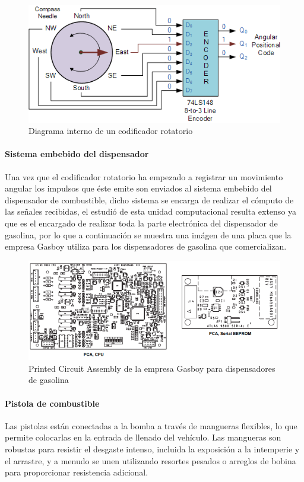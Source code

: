 \begin{figure}[H]
	\centering
	\includegraphics[scale=.8]{Capitulo2/images/electronic_encoder}
	\caption{Diagrama interno de un codificador rotatorio}
	\label{fig:electronic_encoder}
\end{figure}

\paragraph{Sistema embebido del dispensador}
Una vez que el codificador rotatorio ha empezado a registrar un movimiento angular los impulsos que éste emite son enviados al sistema embebido del dispensador de combustible, dicho sistema se encarga de realizar el cómputo de las señales recibidas, el estudió de esta unidad computacional resulta extenso ya que es el encargado de realizar toda la parte electrónica del dispensador de gasolina, por lo que a continuación se muestra una imágen de una placa que la empresa Gasboy utiliza para los dispensadores de gasolina que comercializan.

\begin{figure}[H]
	\centering
	\includegraphics[scale=.8]{Capitulo2/images/pca_gasboy}
	\caption{Printed Circuit Assembly de la empresa Gasboy para dispensadores de gasolina}
	\label{fig:pca_gasboy}
\end{figure}

\paragraph{Pistola de combustible}
Las pistolas están conectadas a la bomba a través de mangueras flexibles, lo que permite colocarlas en la entrada de llenado del vehículo. Las mangueras son robustas para resistir el desgaste intenso, incluida la exposición a la intemperie y el arrastre, y a menudo se unen utilizando resortes pesados o arreglos de bobina para proporcionar resistencia adicional.

